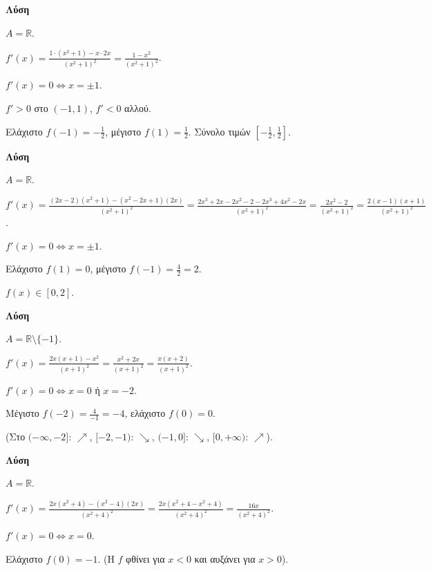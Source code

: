 \documentclass[11pt,a4paper,modern]{FFExercises}
\begin{document}
\askhsh %
\textbf{Λύση}
\begin{alist}
    \item $A = \mathbb{R}$.
    \item $f'(x) = \frac{1 \cdot (x^2+1) - x \cdot 2x}{(x^2+1)^2} = \frac{1 - x^2}{(x^2+1)^2}$.
    \item $f'(x) = 0 \Leftrightarrow x = \pm 1$.
    \item $f' > 0$ στο $(-1, 1)$, $f' < 0$ αλλού.
    \item Ελάχιστο $f(-1) = -\frac{1}{2}$, μέγιστο $f(1) = \frac{1}{2}$. Σύνολο τιμών $\left[-\frac{1}{2}, \frac{1}{2}\right]$.
\end{alist}

\askhsh %
\textbf{Λύση}
\begin{alist}
    \item $A = \mathbb{R}$.
    \item $f'(x) = \frac{(2x-2)(x^2+1) - (x^2-2x+1)(2x)}{(x^2+1)^2} = \frac{2x^3 + 2x - 2x^2 - 2 - 2x^3 + 4x^2 - 2x}{(x^2+1)^2} = \frac{2x^2 - 2}{(x^2+1)^2} = \frac{2(x-1)(x+1)}{(x^2+1)^2}$.
    \item $f'(x) = 0 \Leftrightarrow x = \pm 1$.
    \item Ελάχιστο $f(1) = 0$, μέγιστο $f(-1) = \frac{4}{2} = 2$.
    \item $f(x) \in [0, 2]$.
\end{alist}

\askhsh %
\textbf{Λύση}
\begin{alist}
    \item $A = \mathbb{R} \setminus \{-1\}$.
    \item $f'(x) = \frac{2x(x+1) - x^2}{(x+1)^2} = \frac{x^2 + 2x}{(x+1)^2} = \frac{x(x+2)}{(x+1)^2}$.
    \item $f'(x) = 0 \Leftrightarrow x = 0$ ή $x = -2$.
    \item Μέγιστο $f(-2) = \frac{4}{-1} = -4$, ελάχιστο $f(0) = 0$.
    \item (Στο $(-\infty, -2]$: $\nearrow$, $[-2, -1)$: $\searrow$, $(-1, 0]$: $\searrow$, $[0, +\infty)$: $\nearrow$).
\end{alist}

\askhsh %
\textbf{Λύση}
\begin{alist}
    \item $A = \mathbb{R}$.
    \item $f'(x) = \frac{2x(x^2+4) - (x^2-4)(2x)}{(x^2+4)^2} = \frac{2x(x^2+4-x^2+4)}{(x^2+4)^2} = \frac{16x}{(x^2+4)^2}$.
    \item $f'(x) = 0 \Leftrightarrow x = 0$.
    \item Ελάχιστο $f(0) = -1$. (Η $f$ φθίνει για $x < 0$ και αυξάνει για $x > 0$).
\end{alist}
\end{document}
